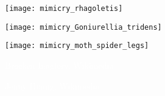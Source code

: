 \documentclass[t]{beamer}
\begin{document}
{
\begin{frame}{}
\centering
	\texttt{[image: mimicry\_rhagoletis]}
\end{frame}
}
%
{
\begin{frame}{}
\centering
	\texttt{[image: mimicry\_Goniurellia\_tridens]}
\end{frame}
}
%
{
\begin{frame}{}
\centering
	\texttt{[image: mimicry\_moth\_spider\_legs]}
\end{frame}
}
%
{
\begin{frame}[b]{}
\tiny\textcolor{white}{Brocken Inaglory, Wikimedia }
\end{frame}
}
%
{
\begin{frame}[b]

	\hfill \tiny\textcolor{white}{Jenny Huang, Wikimedia }
\end{frame}
}
\end{document}
